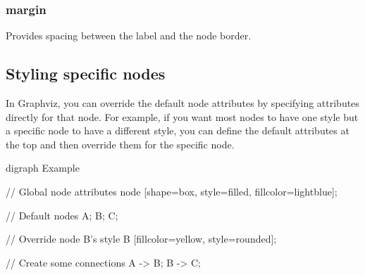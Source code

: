 \documentclass{report}
\begin{document}
    \bigbreak \noindent 
    \subsubsection{margin}
    \bigbreak \noindent 
     Provides spacing between the label and the node border.

     \bigbreak \noindent 
     \subsection{Styling specific nodes}
     \bigbreak \noindent 
     In Graphviz, you can override the default node attributes by specifying attributes directly for that node. For example, if you want most nodes to have one style but a specific node to have a different style, you can define the default attributes at the top and then override them for the specific node.
     \bigbreak \noindent 
     \begin{cppcode}
         digraph Example {
             // Global node attributes
             node [shape=box, style=filled, fillcolor=lightblue];

             // Default nodes
             A;
             B;
             C;

             // Override node B's style
             B [fillcolor=yellow, style=rounded];

             // Create some connections
             A -> B;
             B -> C;
         }
     \end{cppcode}

     \bigbreak \noindent 
\end{document}
